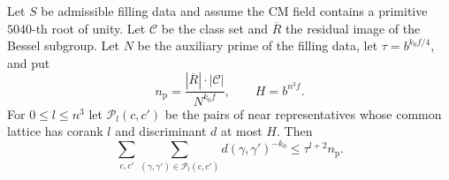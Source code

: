 \begin{lemma}
\label{lem:b-pair-disc-count}
\emitthmsource
Let $S$ be admissible filling data and assume the CM field contains a primitive $5040$-th root of unity.
Let $\mathcal C$ be the class set and $\overline R$ the residual image of the Bessel subgroup.
Let $N$ be the auxiliary prime of the filling data, let $\tau=b^{k_0 f/4}$, and put
\[
 n_{\mathrm p}=\frac{|\overline R|\cdot|\mathcal C|}{N^{k_0 f}},
 \qquad H=b^{n^3 f}.
\]
For $0\le l\le n^3$ let $\mathcal P_l(c,c')$ be the pairs of near representatives whose common lattice has corank $l$
and discriminant $d$ at most $H$. Then
\[
  \sum_{c,c'}\sum_{(\gamma,\gamma')\in \mathcal P_l(c,c')}
        d(\gamma,\gamma')^{-k_0}\le \tau^{l+2}n_{\mathrm p}.
\]
\end{lemma}
